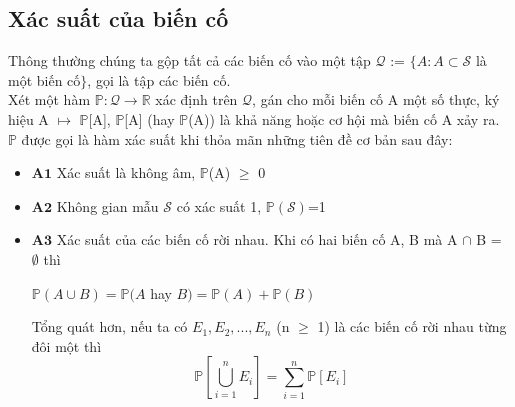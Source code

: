 \documentclass[a4paper, 13pt]{report}
\begin{document}
\subsection*{Xác suất của biến cố}
Thông thường chúng ta gộp tất cả các biến cố vào một tập $\mathcal{Q}$ := $\{ A: A \subset \mathcal{S}$ là một biến cố$\}$, gọi là tập các biến cố.\\
Xét một hàm $\mathbb{P}: \mathcal{Q} \rightarrow \mathbb{R}$ xác định trên $\mathcal{Q}$, gán cho mỗi biến cố A một số thực, ký hiệu A $\mapsto$ $\mathbb{P}$[A], $\mathbb{P}$[A] (hay $\mathbb{P}$(A)) là khả năng hoặc cơ hội mà biến cố A xảy ra. $\mathbb{P}$ được gọi là hàm xác suất khi thỏa mãn những tiên đề cơ bản sau đây:\\
\begin{itemize}
\item $\textbf{A1}$ Xác suất là không âm, $\mathbb{P}$(A) $\geq$ 0
\item $\textbf{A2}$ Không gian mẫu $\mathcal{S}$ có xác suất 1, $\mathbb{P}(\mathcal{S})$=1
\item $\textbf{A3}$ Xác suất của các biến cố rời nhau. Khi có hai biến cố A, B mà A $\cap$ B = $\emptyset$ thì\\
\begin{center}
$ \mathbb{P}(A \cup B) = \mathbb{P}(A $ hay $B) = \mathbb{P}(A) + \mathbb{P}(B)$
\end{center}
Tổng quát hơn, nếu ta có $E_{1}, E_{2},...,E_{n}$ (n $\geq$ 1) là các biến cố rời nhau từng đôi một thì\\
\[
\mathbb{P}\left[\bigcup_{i=1}^n E_{i}\right]=\sum_{i=1}^n \mathbb{P}[E_i]
\]
\end{itemize}
\end{document}
